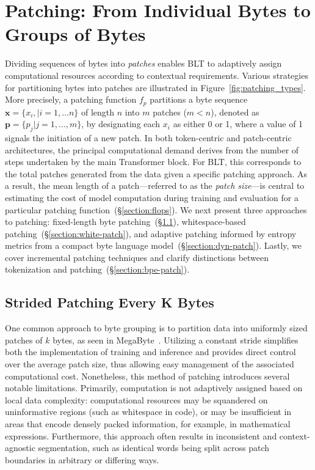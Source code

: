 \section{Patching: From Individual Bytes to Groups of Bytes}
\label{section:patching}

Dividing sequences of bytes into \textit{patches} enables {\textsc BLT} to adaptively assign computational resources according to contextual requirements. Various strategies for partitioning bytes into patches are illustrated in Figure~\ref{fig:patching_types}. More precisely, a patching function $f_p$ partitions a byte sequence $\pmb{x}=\{x_i,|i=1,\ldots n\}$ of length $n$ into $m$ patches ($m < n$), denoted as $\pmb{p}=\{p_j|j=1,\ldots,m\}$, by designating each $x_i$ as either 0 or 1, where a value of 1 signals the initiation of a new patch. In both token-centric and patch-centric architectures, the principal computational demand derives from the number of steps undertaken by the main Transformer block. For {\textsc BLT}, this corresponds to the total patches generated from the data given a specific patching approach. As a result, the mean length of a patch—referred to as the \textit{patch size}—is central to estimating the cost of model computation during training and evaluation for a particular patching function~(\S\ref{section:flops}). 
We next present three approaches to patching: fixed-length byte patching~(\S\ref{section:static-patch}), whitespace-based patching~(\S\ref{section:white-patch}), and adaptive patching informed by entropy metrics from a compact byte language model~(\S\ref{section:dyn-patch}). Lastly, we cover incremental patching techniques and clarify distinctions between tokenization and patching~(\S\ref{section:bpe-patch}).

\subsection{Strided Patching Every K Bytes}
\label{section:static-patch}

One common approach to byte grouping is to partition data into uniformly sized patches of $k$ bytes, as seen in MegaByte~\citep{yu2023megabyte}. Utilizing a constant stride simplifies both the implementation of training and inference and provides direct control over the average patch size, thus allowing easy management of the associated computational cost. Nonetheless, this method of patching introduces several notable limitations. Primarily, computation is not adaptively assigned based on local data complexity: computational resources may be squandered on uninformative regions (such as whitespace in code), or may be insufficient in areas that encode densely packed information, for example, in mathematical expressions. Furthermore, this approach often results in inconsistent and context-agnostic segmentation, such as identical words being split across patch boundaries in arbitrary or differing ways.


